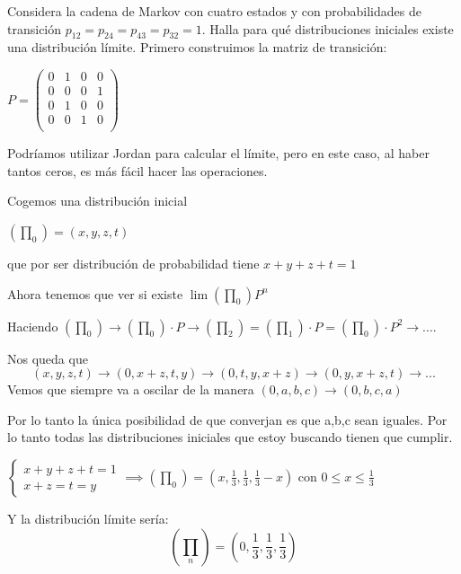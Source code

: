 \begin{problem}[2]
	Considera la cadena de Markov con cuatro estados y con probabilidades de transición
	$p_{12} = p_{24} = p_{43} = p_{32} = 1$. Halla para qué distribuciones iniciales existe una distribución
	límite.
	\solution
	Primero construimos la matriz de transición:

	$P = \left(\begin{matrix}
	0&1&0&0\\0&0&0&1\\0&1&0&0\\0&0&1&0\\
	\end{matrix}\right)$

	Podríamos utilizar Jordan para calcular el límite, pero en este caso, al haber tantos ceros, es más fácil hacer las operaciones.

	Cogemos una distribución inicial

	$(\prod_0)= (x,y,z,t)$

	que por ser distribución de probabilidad tiene $x+y+z+t=1$

	Ahora tenemos que ver si existe $\lim (\prod_0) P^n $

	Haciendo $(\prod_0) \rightarrow (\prod_0)\cdot P \rightarrow (\prod_2) = (\prod_1) \cdot P = (\prod_0)\cdot P^2 \rightarrow . . . . $

	Nos queda que
	$$(x,y,z,t) \rightarrow (0,x+z,t,y) \rightarrow (0,t,y,x + z)\rightarrow(0,y,x+z,t) \rightarrow . . . $$
	Vemos que siempre va a oscilar de la manera $(0,a,b,c) \rightarrow (0,b,c,a)$

	Por lo tanto la única posibilidad de que converjan es que a,b,c sean iguales. Por lo tanto todas las distribuciones iniciales que estoy buscando tienen que cumplir.

	$\begin{cases}
		 x + y + z + t = 1\\
		 x+z=t=y
	\end{cases} \implies (\prod_0) = (x,\frac{1}{3}, \frac{1}{3},\frac{1}{3} -x)$ con $0 \leq x \leq \frac{1}{3}$

	Y la distribución límite sería:
	$$\left(\prod_n\right) = \left(0, \frac{1}{3}, \frac{1}{3}, \frac{1}{3}\right)$$
\end{problem}

